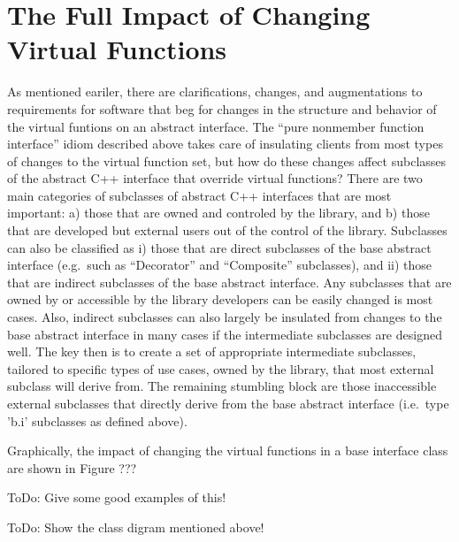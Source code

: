 \documentclass[pdf,ps2pdf,11pt]{SANDreport}
\begin{document}
%
\section{The Full Impact of Changing Virtual Functions}
%

As mentioned eariler, there are clarifications, changes, and augmentations to
requirements for software that beg for changes in the structure and behavior
of the virtual funtions on an abstract interface.  The ``pure nonmember
function interface'' idiom described above takes care of insulating clients
from most types of changes to the virtual function set, but how do these
changes affect subclasses of the abstract C++ interface that override virtual
functions?  There are two main categories of subclasses of abstract C++
interfaces that are most important: a) those that are owned and controled by
the library, and b) those that are developed but external users out of the
control of the library.  Subclasses can also be classified as i) those that
are direct subclasses of the base abstract interface (e.g.\ such as
``Decorator'' and ``Composite'' subclasses), and ii) those that are indirect
subclasses of the base abstract interface.  Any subclasses that are owned by
or accessible by the library developers can be easily changed is most cases.
Also, indirect subclasses can also largely be insulated from changes to the
base abstract interface in many cases if the intermediate subclasses are
designed well.  The key then is to create a set of appropriate intermediate
subclasses, tailored to specific types of use cases, owned by the library,
that most external subclass will derive from.  The remaining stumbling block
are those inaccessible external subclasses that directly derive from the base
abstract interface (i.e.\ type 'b.i' subclasses as defined above).

Graphically, the impact of changing the virtual functions in a base interface
class are shown in Figure ???

ToDo: Give some good examples of this!

ToDo: Show the class digram mentioned above!

%
\clearpage



%
%

\end{document}
